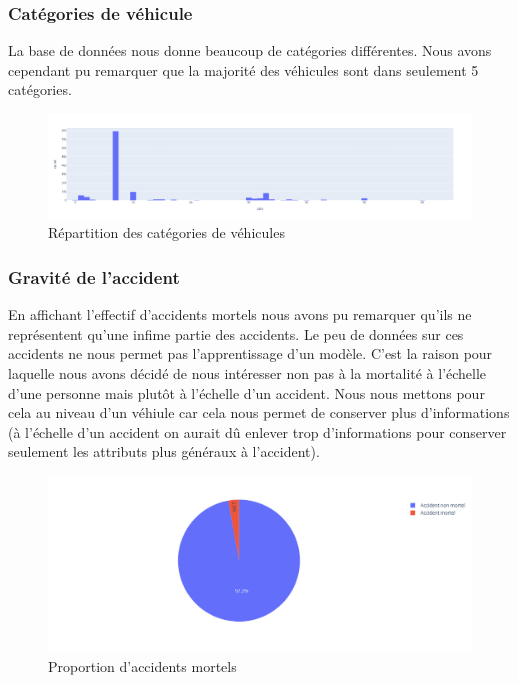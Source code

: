 \documentclass[]{article}
\begin{document}
    \subsubsection{Catégories de véhicule}
    La base de données nous donne beaucoup de catégories différentes. Nous avons cependant pu remarquer 
    que la majorité des véhicules sont dans seulement 5 catégories.
    \begin{figure}[ht]
        \centering
        \includegraphics[width=12cm]{./img/catv1.png}
        \caption{Répartition des catégories de véhicules}
    \end{figure}

    \subsubsection{Gravité de l'accident}
    En affichant l'effectif d'accidents mortels nous avons pu remarquer qu'ils ne représentent qu'une 
    infime partie des accidents. Le peu de données sur ces accidents ne nous permet pas l'apprentissage 
    d'un modèle. C'est la raison pour laquelle nous avons décidé de nous intéresser non pas à la mortalité 
    à l'échelle d'une personne mais plutôt à l'échelle d'un accident. Nous nous mettons pour cela au niveau d'un 
    véhiule car cela nous permet de conserver plus d'informations (à l'échelle d'un accident on aurait 
    dû enlever trop d'informations pour conserver seulement les attributs plus généraux à l'accident).

    \begin{figure}[ht]
        \centering
        \includegraphics[width=12cm]{./img/grav1.png}
        \caption{Proportion d'accidents mortels}
    \end{figure}
\end{document}
